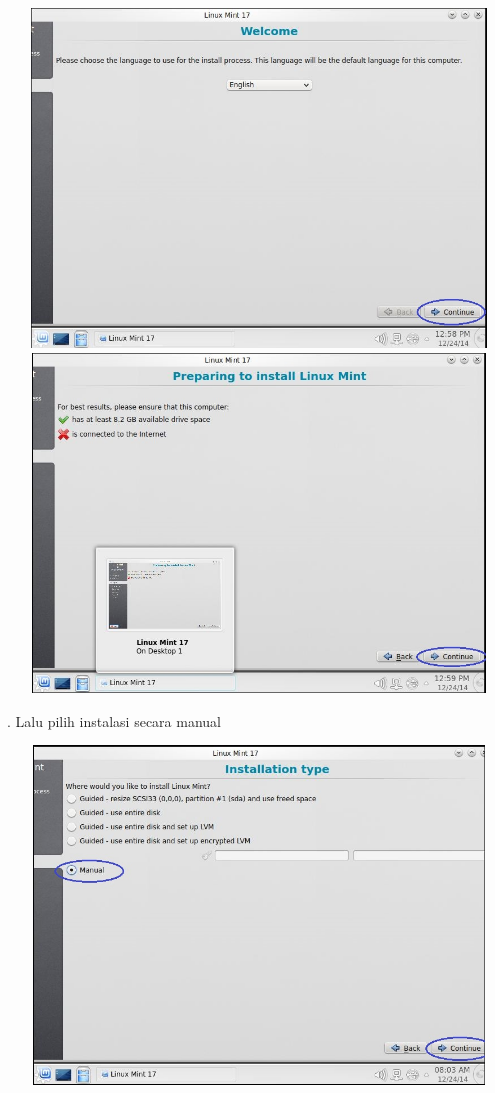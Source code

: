 \documentclass[11pt,fleqn]{book} %
\begin{document}
\begin{center}
\includegraphics[width=14cm,height=9cm]{Capture2.JPG}\\
\vspace{2cm}
\includegraphics[width=14cm,height=9cm]{Capture3.JPG}
\end{center}
. Lalu pilih instalasi secara manual
\begin{center}
\includegraphics[width=14cm,height=9cm]{Capture5.JPG}
\end{center}
\end{document}
